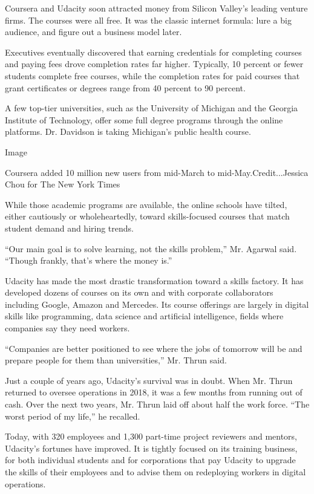 Coursera and Udacity soon attracted money from Silicon Valley's leading
venture firms. The courses were all free. It was the classic internet
formula: lure a big audience, and figure out a business model later.

Executives eventually discovered that earning credentials for completing
courses and paying fees drove completion rates far higher. Typically, 10
percent or fewer students complete free courses, while the completion
rates for paid courses that grant certificates or degrees range from 40
percent to 90 percent.

A few top-tier universities, such as the University of Michigan and the
Georgia Institute of Technology, offer some full degree programs through
the online platforms. Dr. Davidson is taking Michigan's public health
course.

Image

Coursera added 10 million new users from mid-March to
mid-May.Credit...Jessica Chou for The New York Times

While those academic programs are available, the online schools have
tilted, either cautiously or wholeheartedly, toward skills-focused
courses that match student demand and hiring trends.

``Our main goal is to solve learning, not the skills problem,'' Mr.
Agarwal said. ``Though frankly, that's where the money is.''

Udacity has made the most drastic transformation toward a skills
factory. It has developed dozens of courses on its own and with
corporate collaborators including Google, Amazon and Mercedes. Its
course offerings are largely in digital skills like programming, data
science and artificial intelligence, fields where companies say they
need workers.

``Companies are better positioned to see where the jobs of tomorrow will
be and prepare people for them than universities,'' Mr. Thrun said.

Just a couple of years ago, Udacity's survival was in doubt. When Mr.
Thrun returned to oversee operations in 2018, it was a few months from
running out of cash. Over the next two years, Mr. Thrun laid off about
half the work force. ``The worst period of my life,'' he recalled.

Today, with 320 employees and 1,300 part-time project reviewers and
mentors, Udacity's fortunes have improved. It is tightly focused on its
training business, for both individual students and for corporations
that pay Udacity to upgrade the skills of their employees and to advise
them on redeploying workers in digital operations.

